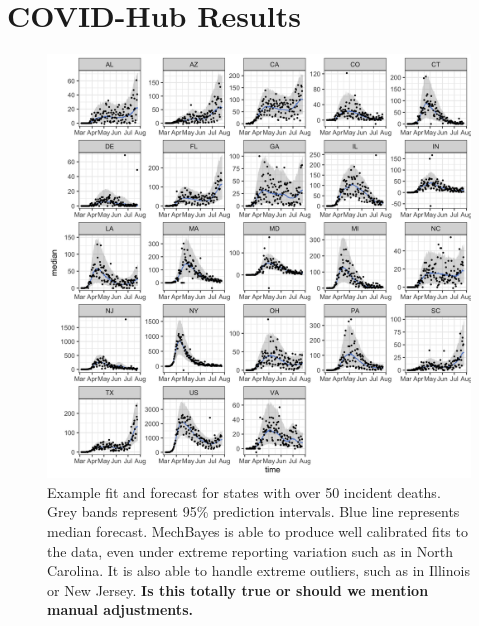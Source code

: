 \documentclass[11pt]{amsart}
\begin{document}
\section{COVID-Hub Results}


\begin{figure}

    \includegraphics[scale=.2]{fit_and_forecast_results.png}

\caption{Example fit and forecast for states with over 50 incident deaths. Grey bands represent 95\% prediction intervals. Blue line represents median forecast. MechBayes is able to produce well calibrated fits to the data, even under extreme reporting variation such as in North Carolina. It is also able to handle extreme outliers, such as in Illinois or New Jersey. \textbf{Is this totally true or should we mention manual adjustments.}}
\label{fig:fit_and_forecast_results}
\end{figure}

	
 
\end{document}

